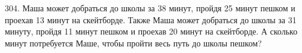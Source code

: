 304. Маша может добраться до школы за 38 минут, пройдя 25 минут пешком и проехав 13 минут на скейтборде. Также Маша может добраться до школы за 31 минуту, пройдя 11 минут пешком и проехав 20 минут на скейтборде. А сколько минут потребуется Маше, чтобы пройти весь путь до школы пешком?\\
